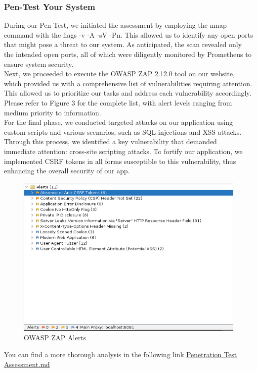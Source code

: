 \documentclass{article}
\begin{document}
	\subsubsection{Pen-Test Your System}
    During our Pen-Test, we initiated the assessment by employing the nmap command with the flags -v -A -sV -Pn. This allowed us to identify any open ports that might pose a threat to our system. As anticipated, the scan revealed only the intended open ports, all of which were diligently monitored by Prometheus to ensure system security.\\
	Next, we proceeded to execute the OWASP ZAP 2.12.0 tool on our website, which provided us with a comprehensive list of vulnerabilities requiring attention. This allowed us to prioritize our tasks and address each vulnerability accordingly. Please refer to Figure 3 for the complete list, with alert levels ranging from medium priority to information.\\
	For the final phase, we conducted targeted attacks on our application using custom scripts and various scenarios, such as SQL injections and XSS attacks. Through this process, we identified a key vulnerability that demanded\\ immediate attention: cross-site scripting attacks. To fortify our application, we implemented CSRF tokens in all forms susceptible to this vulnerability, thus enhancing the overall security of our app.
 \begin{figure}[H]
		\includegraphics[width=12cm]{images/Screenshot_3.png}
		\centering
		\caption{OWASP ZAP Alerts}
		\label{fig:alerts}
	\end{figure}
 You can find a more thorough analysis in the following link \href{https://github.com/szymongalecki/ITU-MiniTwit/blob/main/dev_notes/Penetration%20Test%20Assesment.md}{Penetration Test Assessment.md}
\end{document}
